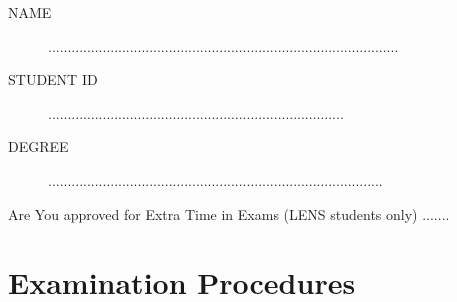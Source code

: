 \documentclass[11pt]{article} %
\begin{document}
	
	
	\Large
	\newpage
	
	\begin{framed}
		\begin{description}
			\item[NAME]  ..........................................................................................
			\bigskip
			\item[STUDENT ID] ............................................................................
			\bigskip
			\item[DEGREE] ......................................................................................
		\end{description}
	\end{framed}
	\noindent Are You approved for Extra Time in Exams (LENS students only)  .......
	\section*{Examination Procedures}
	
\end{document}

